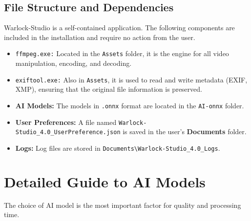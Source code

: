 \documentclass[11pt, a4paper]{article}
\newcommand{\inlinecode}[1]{\colorbox{WarlockLightGray}{\small\texttt{#1}}}
\begin{document}
\subsection{File Structure and Dependencies}
\begin{infobox}
Warlock-Studio is a self-contained application. The following components are included in the installation and require no action from the user.
\end{infobox}
\begin{itemize}[leftmargin=*]
    \item \inlinecode{ffmpeg.exe:} Located in the \texttt{Assets} folder, it is the engine for all video manipulation, encoding, and decoding.
    \item \inlinecode{exiftool.exe:} Also in \texttt{Assets}, it is used to read and write metadata (EXIF, XMP), ensuring that the original file information is preserved.
    \item \textbf{AI Models:} The models in \texttt{.onnx} format are located in the \texttt{AI-onnx} folder.
    \item \textbf{User Preferences:} A file named \texttt{Warlock-Studio\_4.0\_UserPreference.json} is saved in the user's \textbf{Documents} folder.
    \item \textbf{Logs:} Log files are stored in \texttt{Documents\textbackslash Warlock-Studio\_4.0\_Logs}.
\end{itemize}


\section{Detailed Guide to AI Models}
The choice of AI model is the most important factor for quality and processing time.
\end{document}
